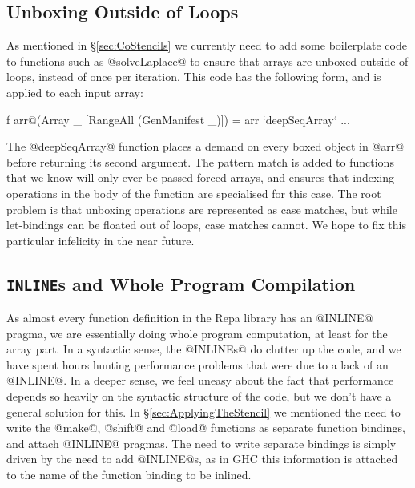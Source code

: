 \subsection{Unboxing Outside of Loops}
\label{sec:UnboxingOutsideOfLoops}
As mentioned in \S\ref{sec:CoStencils} we currently need to add some boilerplate code to functions such as @solveLaplace@ to ensure that arrays are unboxed outside of loops, instead of once per iteration. This code has the following form, and is applied to each input array:

\begin{small}
\begin{code}
  f arr@(Array _ [RangeAll (GenManifest _)]) 
   = arr `deepSeqArray` ...
\end{code}
\end{small}

The @deepSeqArray@ function places a demand on every boxed object in @arr@ before returning its second argument. The pattern match is added to functions that we know will only ever be passed forced arrays, and ensures that indexing operations in the body of the function are specialised for this case. The root problem is that unboxing operations are represented as case matches, but while let-bindings can be floated out of loops, case matches cannot. We hope to fix this particular infelicity in the near future.


\subsection{\texttt{INLINE}s and Whole Program Compilation}
\label{sec:MultiStage}

As almost every function definition in the Repa library has an @INLINE@ pragma, we are essentially doing whole program computation, at least for the array part. In a syntactic sense, the @INLINEs@ do clutter up the code, and we have spent hours hunting performance problems that were due to a lack of an @INLINE@. In a deeper sense, we feel uneasy about the fact that performance depends so heavily on the syntactic structure of the code, but we don't have a general solution for this. In \S\ref{sec:ApplyingTheStencil} we mentioned the need to write the @make@, @shift@ and @load@ functions as separate function bindings, and attach @INLINE@ pragmas. The need to write separate bindings is simply driven by the need to add @INLINE@s, as in GHC this information is attached to the name of the function binding to be inlined.

